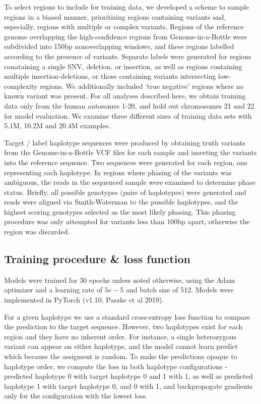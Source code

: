 \documentclass[]{article}
\begin{document}
To select regions to include for training data, we developed a scheme to sample regions in a biased manner, prioritizing regions containing variants and, especially, regions with multiple or complex variants. Regions of the reference genome overlapping the high-confidence regions from Genome-in-a-Bottle were subdivided into 150bp nonoverlapping windows, and these regions labelled according to the presence of variants. Separate labels were generated for regions conataining a single SNV, deletion, or insertion, as well as regions containing multiple insertion-deletions, or those containing variants intersecting low-complexity regions. We additionally included `true negative' regions where no known variant was present.  For all analyses described here, we obtain training data only from the human autosomes 1-20, and hold out chromosomes 21 and 22 for model evaluation.  We examine three different sizes of training data sets with 5.1M, 10.2M and 20.4M examples. 

Target / label haplotype sequences were produced by obtaining truth variants from the Genome-in-a-Bottle VCF files for each sample and inserting the variants into the reference sequence. Two sequences were generated for each region, one representing each haplotype. In regions where phasing of the variants was ambiguous, the reads in the sequenced sample were examined to determine phase status. Briefly, all possible genotypes (pairs of haplotypes) were generated and reads were aligned via Smith-Waterman to the possible haplotypes, and the highest scoring genotypes selected as the most likely phasing. This phasing procedure was only attempted for variants less than 100bp apart, otherwise the region was discarded.


\subsection{Training procedure \& loss function}

Models were trained for 30 epochs unless noted otherwise, using the Adam optimizer and a learning rate of $5e-5$ and batch size of 512. Models were implemented in PyTorch (v1.10, Paszke et al 2019).

For a given haplotype we use a standard cross-entropy loss function to compare the prediction to the target sequence. However, two haplotypes exist for each region and they have no inherent order. For instance, a single heterozygous variant can appear on either haplotype, and the model cannot learn predict which because the assigment is random. To make the predictions opaque to haplotype order, we compute the loss in both haplotype configurations - predicted haplotype 0 with target haplotype 0 and 1 with 1, as well as predicted haplotype 1 with target haplotype 0, and 0 with 1, and backpropogate gradients only for the configuration with the lowest loss. 
\end{document}
